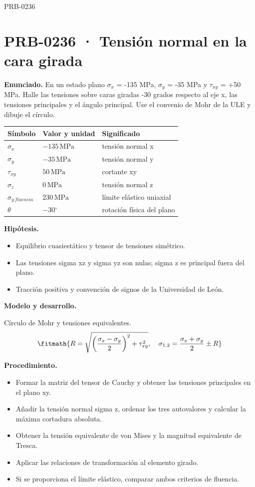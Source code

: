 \begin{studiumworked}{PRB-0236}

\section{PRB-0236 · Tensión normal en la cara girada}

\textbf{Enunciado.} En un estado plano $\sigma_x$ = -135 MPa, $\sigma_y$ = -35 MPa y $\tau_{xy}$ = +50 MPa. Halle las tensiones sobre caras giradas -30 grados respecto al eje x, las tensiones principales y el ángulo principal. Use el convenio de Mohr de la ULE y dibuje el círculo.

\par\medskip\noindent\begin{tabular}{@{}p{.18\linewidth}p{.26\linewidth}p{.48\linewidth}@{}}
\toprule Símbolo & Valor y unidad & Significado\\\midrule
$\sigma_{x}$ & $-135\,\mathrm{MPa}$ & tensión normal x\\
$\sigma_{y}$ & $-35\,\mathrm{MPa}$ & tensión normal y\\
$\tau_{xy}$ & $50\,\mathrm{MPa}$ & cortante xy\\
$\sigma_{z}$ & $0\,\mathrm{MPa}$ & tensión normal z\\
$\sigma_{y\,fluencia}$ & $230\,\mathrm{MPa}$ & límite elástico uniaxial\\
$\theta$ & $-30{}^{\circ}$ & rotación física del plano\\
\bottomrule\end{tabular}\par\medskip

\textbf{Hipótesis.}\begin{itemize}\item Equilibrio cuasiestático y tensor de tensiones simétrico.
\item Las tensiones sigma xz y sigma yz son nulas; sigma z es principal fuera del plano.
\item Tracción positiva y convención de signos de la Universidad de León.\end{itemize}

\textbf{Modelo y desarrollo.}

Círculo de Mohr y tensiones equivalentes.\[\fitmath{R=\sqrt{\left(\frac{\sigma_x-\sigma_y}{2}\right)^2+\tau_{xy}^{2}},\quad\sigma_{1,2}=\frac{\sigma_x+\sigma_y}{2}\pm R}\]

\textbf{Procedimiento.}\begin{itemize}\item Formar la matriz del tensor de Cauchy y obtener las tensiones principales en el plano xy.
\item Añadir la tensión normal sigma z, ordenar los tres autovalores y calcular la máxima cortadura absoluta.
\item Obtener la tensión equivalente de von Mises y la magnitud equivalente de Tresca.
\item Aplicar las relaciones de transformación al elemento girado.
\item Si se proporciona el límite elástico, comparar ambos criterios de fluencia.\end{itemize}


\end{studiumworked}
